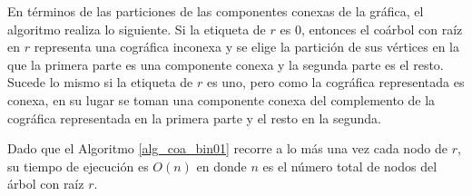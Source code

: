 En términos de las particiones de las componentes conexas de la gráfica, el algoritmo realiza lo siguiente. Si la etiqueta de $r$ es $0$, entonces el coárbol con raíz en $r$ representa una cográfica inconexa y se elige la partición de sus vértices en la que la primera parte es una componente conexa y la segunda parte es el resto. Sucede lo mismo si la etiqueta de $r$ es uno, pero como la cográfica representada es conexa, en su lugar se toman una componente conexa del complemento de la cográfica representada en la primera parte y el resto en la segunda.

Dado que el Algoritmo \ref{alg_coa_bin01} recorre a lo más una vez cada nodo de $r$, su tiempo de ejecución es $O(n)$ en donde $n$ es el número total de nodos del árbol con raíz $r$.
